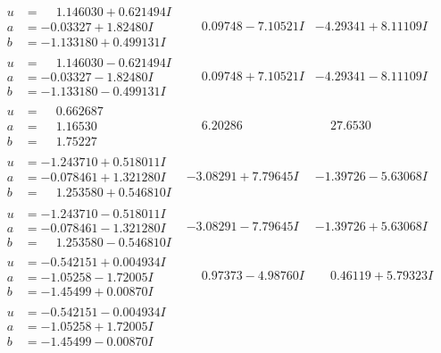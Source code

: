 \documentclass[1p]{elsarticle_modified}
\theoremstyle{definition}
\begin{document}
$$\begin{array}{c|c|c}
\begin{aligned}
u &= \phantom{-}1.146030 + 0.621494 I \\
a &= -0.03327 + 1.82480 I \\
b &= -1.133180 + 0.499131 I\end{aligned}
 & \phantom{-}0.09748 - 7.10521 I & -4.29341 + 8.11109 I \\ \hline\begin{aligned}
u &= \phantom{-}1.146030 - 0.621494 I \\
a &= -0.03327 - 1.82480 I \\
b &= -1.133180 - 0.499131 I\end{aligned}
 & \phantom{-}0.09748 + 7.10521 I & -4.29341 - 8.11109 I \\ \hline\begin{aligned}
u &= \phantom{-}0.662687\phantom{ +0.000000I} \\
a &= \phantom{-}1.16530\phantom{ +0.000000I} \\
b &= \phantom{-}1.75227\phantom{ +0.000000I}\end{aligned}
 & \phantom{-}6.20286\phantom{ +0.000000I} & \phantom{-}27.6530\phantom{ +0.000000I} \\ \hline\begin{aligned}
u &= -1.243710 + 0.518011 I \\
a &= -0.078461 + 1.321280 I \\
b &= \phantom{-}1.253580 + 0.546810 I\end{aligned}
 & -3.08291 + 7.79645 I & -1.39726 - 5.63068 I \\ \hline\begin{aligned}
u &= -1.243710 - 0.518011 I \\
a &= -0.078461 - 1.321280 I \\
b &= \phantom{-}1.253580 - 0.546810 I\end{aligned}
 & -3.08291 - 7.79645 I & -1.39726 + 5.63068 I \\ \hline\begin{aligned}
u &= -0.542151 + 0.004934 I \\
a &= -1.05258 - 1.72005 I \\
b &= -1.45499 + 0.00870 I\end{aligned}
 & \phantom{-}0.97373 - 4.98760 I & \phantom{-}0.46119 + 5.79323 I \\ \hline\begin{aligned}
u &= -0.542151 - 0.004934 I \\
a &= -1.05258 + 1.72005 I \\
b &= -1.45499 - 0.00870 I\end{aligned}

\end{array}$$
\end{document}
